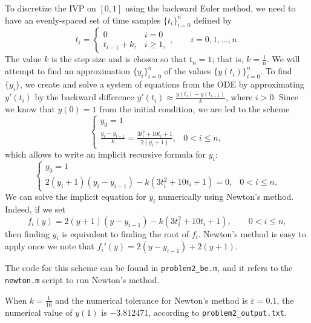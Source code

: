\documentclass{homework}
\begin{document}
\begin{arabicparts}
		\questionpart To discretize the IVP on $[0,1]$ using the backward Euler method, we need to have an evenly-spaced set of time samples $\{t_i\}_{i=0}^n$ defined by
		\begin{equation}
			t_i = \begin{cases}
				0 & i = 0 \\
				t_{i-1} + k, & i \ge 1,
			\end{cases}, \qquad i = 0,1,\dots,n.
		\end{equation}
		The value $k$ is the step size and is chosen so that $t_n = 1$; that is, $k = \frac{1}{n}$. We will attempt to find an approximation $\{y_i\}_{i=0}^n$ of the values $\{y(t_i)\}_{i=0}^n$. To find $\{y_i\}$, we create and solve a system of equations from the ODE by approximating $y'(t_i)$ by the backward difference $y'(t_i) \approx \frac{y(t_i) - y(t_{i-1})}{k}$, where $i > 0$. Since we know that $y(0) = 1$ from the initial condition, we are led to the scheme
		\begin{equation}
			\begin{cases}
				y_0 = 1 &\\
				\frac{y_i - y_{i-1}}{k} = \frac{3t_i^2+10t_i + 1}{2(y_i + 1)}, & 0 < i \le n,
			\end{cases}
		\end{equation}
		which allows to write an implicit recursive formula for $y_i$:
		\begin{equation}
			\begin{cases}
				y_0 = 1 &\\
				2(y_i+1)(y_i-y_{i-1}) - k(3t_i^2+10t_i+1) = 0, & 0 < i \le n.
			\end{cases}
		\end{equation}
		We can solve the implicit equation for $y_i$ numerically using Newton's method. Indeed, if we set
		\begin{equation}
			f_i(y) = 2(y+1)(y-y_{i-1}) - k(3t_i^2+10t_i+1), \qquad 0 < i\le n,
		\end{equation}
		then finding $y_i$ is equivalent to finding the root of $f_i$. Newton's method is easy to apply once we note that $f_i'(y) = 2(y-y_{i-1}) + 2(y+1)$.
		
		The code for this scheme can be found in \lstinline{problem2_be.m}, and it refers to the \lstinline{newton.m} script to run Newton's method.
		
		\questionpart When $k=\frac{1}{16}$ and the numerical tolerance for Newton's method is $\varepsilon = 0.1$, the numerical value of $y(1)$ is $-3.812471$, according to \lstinline{problem2_output.txt}.
		

\end{arabicparts}
\end{document}
